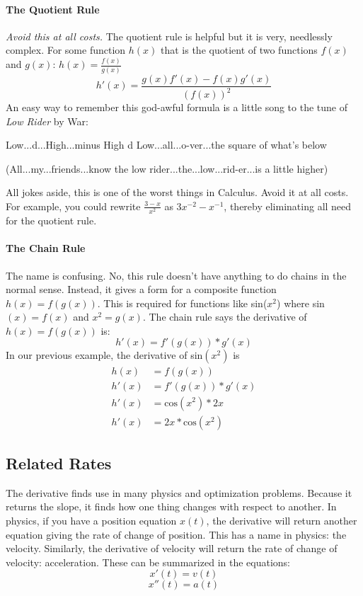 \documentclass[../main.tex]{subfiles}
\begin{document}
\paragraph{The Quotient Rule} \textit{Avoid this at all costs.} The quotient rule is helpful but it is very, needlessly complex. For some function $h(x)$ that is the quotient of two functions $f(x)$ and $g(x)$: $h(x)=\displaystyle\frac{f(x)}{g(x)}$$$h'(x)=\frac{g(x)f'(x)-f(x)g'(x)}{(f(x))^2}$$ An easy way to remember this god-awful formula is a little song to the tune of \textit{Low Rider} by War:
\begin{displayquote}
	Low...d...High...minus High d Low...all...o-ver...the square of what's below 
\end{displayquote}
\begin{displayquote}
	(All...my...friends...know the low rider...the...low...rid-er...is a little higher)
\end{displayquote}
All jokes aside, this is one of the worst things in Calculus. Avoid it at all costs. For example, you could rewrite $\displaystyle\frac{3-x}{x^2}$ as $3x^{-2}-x^{-1}$, thereby eliminating all need for the quotient rule.
\paragraph{The Chain Rule} The name is confusing. No, this rule doesn't have anything to do chains in the normal sense. Instead, it gives a form for a composite function $h(x)=f(g(x))$. This is required for functions like sin($x^2$) where sin$(x)=f(x)$ and $x^2=g(x)$. The chain rule says the derivative of $h(x)=f(g(x))$ is:$$h'(x)=f'(g(x))*g'(x)$$In our previous example, the derivative of sin$(x^2)$ is
\begin{equation}
\begin{split}
h(x) &= f(g(x)) \\
h'(x) &= f'(g(x))*g'(x) \\
h'(x) &= \text{cos}(x^2)*2x \\
h'(x) &= 2x*\text{cos}(x^2)
\end{split}
\end{equation}
\subsection{Related Rates}
\par The derivative finds use in many physics and optimization problems. Because it returns the slope, it finds how one thing changes with respect to another. In physics, if you have a position equation $x(t)$, the derivative will return another equation giving the rate of change of position. This has a name in physics: the velocity. Similarly, the derivative of velocity will return the rate of change of velocity: acceleration. These can be summarized in the equations:$$x'(t)=v(t)$$$$x''(t)=a(t)$$
\end{document}
